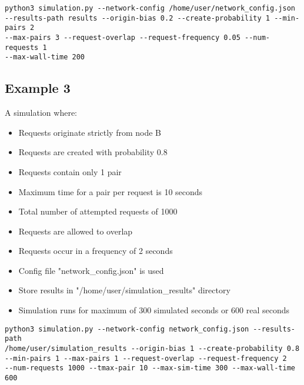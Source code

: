 \documentclass{article}
\begin{document}
\begin{verbatim}
python3 simulation.py --network-config /home/user/network_config.json
--results-path results --origin-bias 0.2 --create-probability 1 --min-pairs 2
--max-pairs 3 --request-overlap --request-frequency 0.05 --num-requests 1
--max-wall-time 200
\end{verbatim}

\subsection{Example 3}
A simulation where:
\begin{itemize}
    \item Requests originate strictly from node B
    \item Requests are created with probability 0.8
    \item Requests contain only 1 pair
    \item Maximum time for a pair per request is 10 seconds
    \item Total number of attempted requests of 1000
    \item Requests are allowed to overlap
    \item Requests occur in a frequency of 2 seconds
    \item Config file "network\_config.json" is used
    \item Store results in "/home/user/simulation\_results" directory
    \item Simulation runs for maximum of 300 simulated seconds or 600 real seconds
\end{itemize}

\begin{verbatim}
python3 simulation.py --network-config network_config.json --results-path
/home/user/simulation_results --origin-bias 1 --create-probability 0.8
--min-pairs 1 --max-pairs 1 --request-overlap --request-frequency 2
--num-requests 1000 --tmax-pair 10 --max-sim-time 300 --max-wall-time 600
\end{verbatim}
\end{document}
